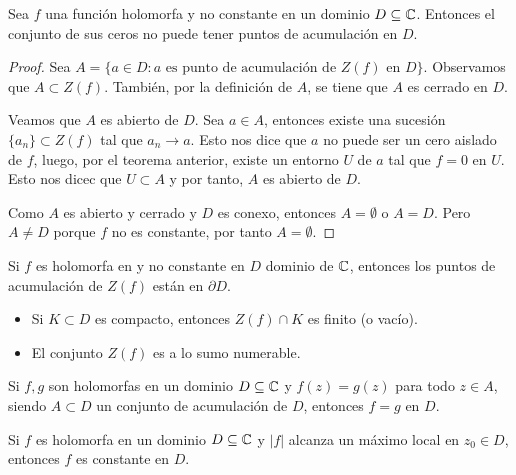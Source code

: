 \begin{teo}
    Sea $f$ una función holomorfa y no constante en un dominio $D \subseteq \mathbb{C}$. Entonces el conjunto de sus ceros no puede tener puntos de acumulación en $D$.
\end{teo}

\begin{proof}
    Sea $A = \{ a \in D : a \text{ es punto de acumulación de } Z(f) \text{ en } D \}$. Observamos que $A \subset Z(f)$. También, por la definición de $A$, se tiene que $A$ es cerrado en $D$.

    Veamos que $A$ es abierto de $D$. Sea $a \in A$, entonces existe una sucesión $\{a_n\} \subset Z(f)$ tal que $a_n \to a$. Esto nos dice que $a$ no puede ser un cero aislado de $f$, luego, por el teorema anterior, existe un entorno $U$ de $a$ tal que $f = 0$ en $U$. Esto nos dicec que $U \subset A$ y por tanto, $A$ es abierto de $D$.

    Como $A$ es abierto y cerrado y $D$ es conexo, entonces $A = \emptyset$ o $A = D$. Pero $A \not = D$ porque $f$ no es constante, por tanto $A = \emptyset$.
\end{proof}

\begin{cor}
    Si $f$ es holomorfa en y no constante en $D$ dominio de $\mathbb{C}$, entonces los puntos de acumulación de $Z(f)$ están en $\partial D$.
\end{cor}

\begin{obs}
    \begin{itemize}
        \item  Si $K \subset D$ es compacto, entonces $Z(f) \cap K$ es finito (o vacío).
        \item El conjunto $Z(f)$ es a lo sumo numerable.
    \end{itemize}
\end{obs}

\begin{cor}
    Si $f,g$ son holomorfas en un dominio $D \subseteq \mathbb{C}$ y $f(z) = g(z)$ para todo $z \in A$, siendo $A \subset D$ un conjunto de acumulación de $D$, entonces $f = g$ en $D$.
\end{cor}

\begin{teo}
    Si $f$ es holomorfa en un dominio $D \subseteq \mathbb{C}$ y $|f|$ alcanza un máximo local en $z_0 \in D$, entonces $f$ es constante en $D$.
\end{teo}

